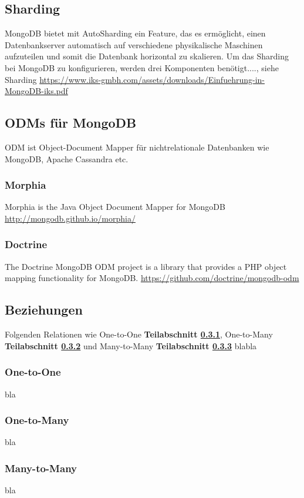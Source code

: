 \subsection{Sharding}\label{sharding}
MongoDB bietet mit AutoSharding ein Feature, das es ermöglicht, einen Datenbankserver automatisch auf verschiedene physikalische Maschinen aufzuteilen und somit die Datenbank horizontal zu skalieren. Um das Sharding bei MongoDB zu konfigurieren, werden drei Komponenten benötigt...., siehe Sharding \url{https://www.iks-gmbh.com/assets/downloads/Einfuehrung-in-MongoDB-iks.pdf
}

\subsection{ODMs für MongoDB}

ODM ist Object-Document Mapper für nichtrelationale Datenbanken wie MongoDB, Apache Cassandra etc.

\subsubsection{Morphia}
Morphia is the Java Object Document Mapper for MongoDB \url{http://mongodb.github.io/morphia/}

\subsubsection{Doctrine}
The Doctrine MongoDB ODM project is a library that provides a PHP object mapping functionality for MongoDB. \url{https://github.com/doctrine/mongodb-odm}

\subsection{Beziehungen}
Folgenden Relationen wie One-to-One \textbf{Teilabschnitt \ref{1:1}}, One-to-Many \textbf{Teilabschnitt \ref{1:n}} und Many-to-Many \textbf{Teilabschnitt \ref{n:m}} blabla

\subsubsection{One-to-One}\label{1:1}
bla

\subsubsection{One-to-Many}\label{1:n}
bla

\subsubsection{Many-to-Many}\label{n:m}
bla

